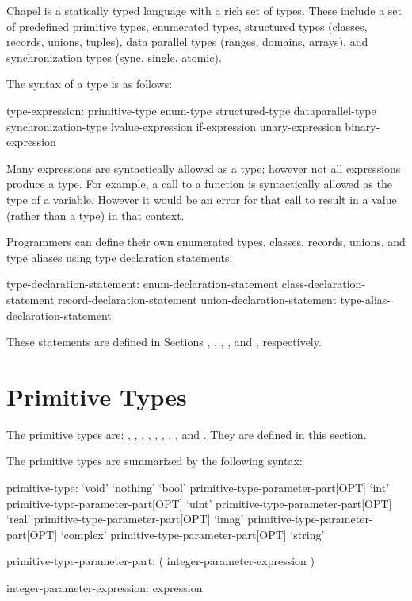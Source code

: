 \label{Types}

Chapel is a statically typed language with a rich set of types.  These
include a set of predefined primitive types, enumerated types,
structured types (classes, records, unions, tuples),
data parallel types (ranges, domains, arrays), and synchronization
types (sync, single, atomic).

The syntax of a type is as follows:

\begin{syntax}
type-expression:
  primitive-type
  enum-type
  structured-type
  dataparallel-type
  synchronization-type
  lvalue-expression
  if-expression
  unary-expression
  binary-expression
\end{syntax}

Many expressions are syntactically allowed as a type; however not
all expressions produce a type. For example, a call to a function is
syntactically allowed as the type of a variable. However it would be an
error for that call to result in a value (rather than a type) in that
context.

Programmers can define their own enumerated types, classes, records,
unions, and type aliases using type declaration statements:

\begin{syntax}
type-declaration-statement:
  enum-declaration-statement
  class-declaration-statement
  record-declaration-statement
  union-declaration-statement
  type-alias-declaration-statement
\end{syntax}

These statements are defined in Sections ,
, ,
, and , respectively.

\section{Primitive Types}
\label{Primitive_Types}

The primitive types are: , , ,
, , , , ,
and .  They are defined
in this section.

The primitive types are summarized by the following syntax:
\begin{syntax}
primitive-type:
  `void'
  `nothing'
  `bool' primitive-type-parameter-part[OPT]
  `int' primitive-type-parameter-part[OPT]
  `uint' primitive-type-parameter-part[OPT]
  `real' primitive-type-parameter-part[OPT]
  `imag' primitive-type-parameter-part[OPT]
  `complex' primitive-type-parameter-part[OPT]
  `string'

primitive-type-parameter-part:
  ( integer-parameter-expression )

integer-parameter-expression:
  expression
\end{syntax}


